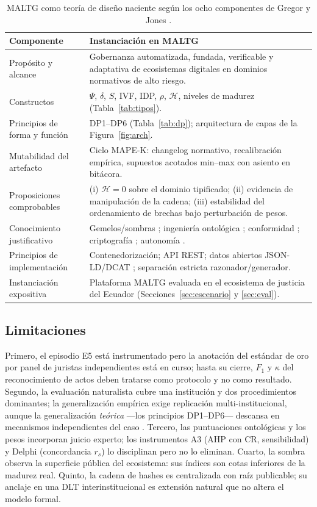 \documentclass[computers,article,submit,pdftex,moreauthors]{Definitions/mdpi}
\begin{document}
\begin{table}[H]
\caption{MALTG como teoría de diseño naciente según los ocho componentes de Gregor y Jones \cite{GregorJones2007}.}
\label{tab:teoria}
\begin{tabularx}{\textwidth}{lX}
\toprule
\textbf{Componente} & \textbf{Instanciación en MALTG}\\
\midrule
Propósito y alcance & Gobernanza automatizada, fundada, verificable y adaptativa de ecosistemas digitales en dominios normativos de alto riesgo.\\
Constructos & $\Psi$, $\delta$, $S$, IVF, IDP, $\rho$, $\mathcal{H}$, niveles de madurez (Tabla~\ref{tab:tipos}).\\
Principios de forma y función & DP1--DP6 (Tabla~\ref{tab:dp}); arquitectura de capas de la Figura~\ref{fig:arch}.\\
Mutabilidad del artefacto & Ciclo MAPE-K: changelog normativo, recalibración empírica, supuestos acotados min--max con asiento en bitácora.\\
Proposiciones comprobables & (i) $\mathcal{H}=0$ sobre el dominio tipificado; (ii) evidencia de manipulación de la cadena; (iii) estabilidad del ordenamiento de brechas bajo perturbación de pesos.\\
Conocimiento justificativo & Gemelos/sombras \cite{Jones2020,Brauner2022}; ingeniería ontológica \cite{Gruber1993,Guarino2002}; conformidad \cite{Rozinat2008}; criptografía \cite{Haber1991}; autonomía \cite{Kephart2003}.\\
Principios de implementación & Contenedorización; API REST; datos abiertos JSON-LD/DCAT \cite{Guha2016}; separación estricta razonador/generador.\\
Instanciación expositiva & Plataforma MALTG evaluada en el ecosistema de justicia del Ecuador (Secciones~\ref{sec:escenario} y \ref{sec:eval}).\\
\bottomrule
\end{tabularx}
\end{table}

\subsection{Limitaciones}
Primero, el episodio E5 está instrumentado pero la anotación del estándar de oro por panel de juristas independientes está en curso; hasta su cierre, $F_1$ y $\kappa$ del reconocimiento de actos deben tratarse como protocolo y no como resultado. Segundo, la evaluación naturalista cubre una institución y dos procedimientos dominantes; la generalización empírica exige replicación multi-institucional, aunque la generalización \emph{teórica} ---los principios DP1--DP6--- descansa en mecanismos independientes del caso \cite{Gregor2013}. Tercero, las puntuaciones ontológicas y los pesos incorporan juicio experto; los instrumentos A3 (AHP con CR, sensibilidad) y Delphi (concordancia $r_s$) lo disciplinan pero no lo eliminan. Cuarto, la sombra observa la superficie pública del ecosistema: sus índices son cotas inferiores de la madurez real. Quinto, la cadena de hashes es centralizada con raíz publicable; su anclaje en una DLT interinstitucional \cite{Olnes2017} es extensión natural que no altera el modelo formal.
\end{document}
